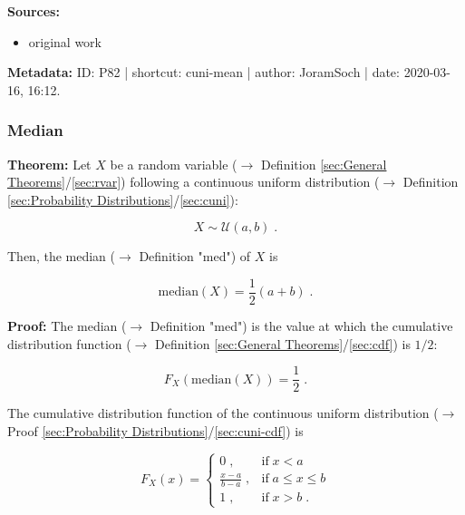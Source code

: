 \documentclass[a4paper,12pt,twoside]{book}
\begin{document}
\vspace{1em}
\textbf{Sources:}
\begin{itemize}
\item original work\end{itemize}


\vspace{1em}
\textbf{Metadata:} ID: P82 | shortcut: cuni-mean | author: JoramSoch | date: 2020-03-16, 16:12.
\vspace{1em}



\subsubsection[\textbf{Median}]{Median} \label{sec:cuni-med}
\setcounter{equation}{0}

\textbf{Theorem:} Let $X$ be a random variable ($\rightarrow$ Definition \ref{sec:General Theorems}/\ref{sec:rvar}) following a continuous uniform distribution ($\rightarrow$ Definition \ref{sec:Probability Distributions}/\ref{sec:cuni}):

\begin{equation} \label{eq:cuni-med-cuni}
X \sim \mathcal{U}(a, b) \; .
\end{equation}

Then, the median ($\rightarrow$ Definition "med") of $X$ is

\begin{equation} \label{eq:cuni-med-cuni-med}
\mathrm{median}(X) = \frac{1}{2} (a+b) \; .
\end{equation}


\vspace{1em}
\textbf{Proof:} The median ($\rightarrow$ Definition "med") is the value at which the cumulative distribution function ($\rightarrow$ Definition \ref{sec:General Theorems}/\ref{sec:cdf}) is $1/2$:

\begin{equation} \label{eq:cuni-med-median}
F_X(\mathrm{median}(X)) = \frac{1}{2} \; .
\end{equation}

The cumulative distribution function of the continuous uniform distribution ($\rightarrow$ Proof \ref{sec:Probability Distributions}/\ref{sec:cuni-cdf}) is

\begin{equation} \label{eq:cuni-med-cuni-cdf}
F_X(x) = \left\{
\begin{array}{rl}
0 \; , & \text{if} \; x < a \\
\frac{x-a}{b-a} \; , & \text{if} \; a \leq x \leq b \\
1 \; , & \text{if} \; x > b \; .
\end{array}
\right.
\end{equation}
\end{document}
